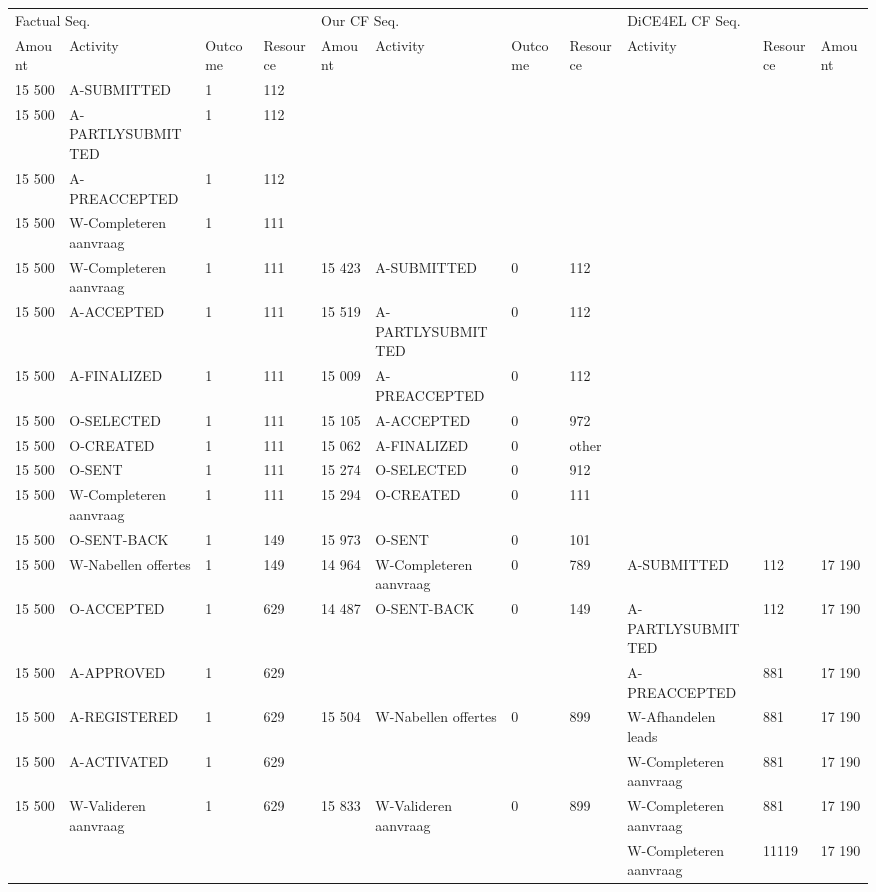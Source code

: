 \begin{tabular}{lllllllllll}
\toprule
\multicolumn{4}{l}{Factual Seq.} & \multicolumn{4}{l}{Our CF Seq.} & \multicolumn{3}{l}{DiCE4EL CF Seq.} \\
Amount & Activity & Outcome & Resource & Amount & Activity & Outcome & Resource & Activity & Resource & Amount \\
\midrule
15 500 & A-SUBMITTED & 1 & 112 &  &  &  &  &  &  &  \\
15 500 & A-PARTLYSUBMITTED & 1 & 112 &  &  &  &  &  &  &  \\
15 500 & A-PREACCEPTED & 1 & 112 &  &  &  &  &  &  &  \\
15 500 & W-Completeren aanvraag & 1 & 111 &  &  &  &  &  &  &  \\
15 500 & W-Completeren aanvraag & 1 & 111 & 15 423 & A-SUBMITTED & 0 & 112 &  &  &  \\
15 500 & A-ACCEPTED & 1 & 111 & 15 519 & A-PARTLYSUBMITTED & 0 & 112 &  &  &  \\
15 500 & A-FINALIZED & 1 & 111 & 15 009 & A-PREACCEPTED & 0 & 112 &  &  &  \\
15 500 & O-SELECTED & 1 & 111 & 15 105 & A-ACCEPTED & 0 & 972 &  &  &  \\
15 500 & O-CREATED & 1 & 111 & 15 062 & A-FINALIZED & 0 & other &  &  &  \\
15 500 & O-SENT & 1 & 111 & 15 274 & O-SELECTED & 0 & 912 &  &  &  \\
15 500 & W-Completeren aanvraag & 1 & 111 & 15 294 & O-CREATED & 0 & 111 &  &  &  \\
15 500 & O-SENT-BACK & 1 & 149 & 15 973 & O-SENT & 0 & 101 &  &  &  \\
15 500 & W-Nabellen offertes & 1 & 149 & 14 964 & W-Completeren aanvraag & 0 & 789 & A-SUBMITTED & 112 & 17 190 \\
15 500 & O-ACCEPTED & 1 & 629 & 14 487 & O-SENT-BACK & 0 & 149 & A-PARTLYSUBMITTED & 112 & 17 190 \\
15 500 & A-APPROVED & 1 & 629 &  &  &  &  & A-PREACCEPTED & 881 & 17 190 \\
15 500 & A-REGISTERED & 1 & 629 & 15 504 & W-Nabellen offertes & 0 & 899 & W-Afhandelen leads & 881 & 17 190 \\
15 500 & A-ACTIVATED & 1 & 629 &  &  &  &  & W-Completeren aanvraag & 881 & 17 190 \\
15 500 & W-Valideren aanvraag & 1 & 629 & 15 833 & W-Valideren aanvraag & 0 & 899 & W-Completeren aanvraag & 881 & 17 190 \\
 &  &  &  &  &  &  &  & W-Completeren aanvraag & 11119 & 17 190 \\
\bottomrule
\end{tabular}
